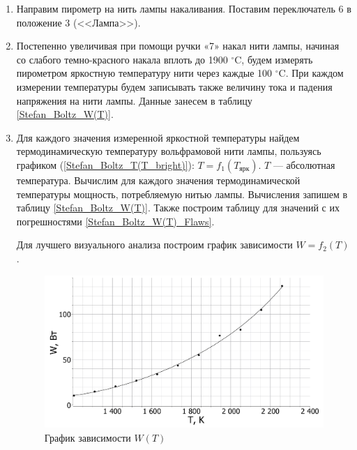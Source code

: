 	\begin{enumerate}
		\item Направим пирометр на нить лампы накаливания. Поставим переключатель 6 в положение 3 (<<Лампа>>).
		
		\item Постепенно увеличивая при помощи ручки «7» накал нити лампы, начиная со слабого темно-красного накала вплоть до 1900 $^\circ$C, будем измерять пирометром яркостную температуру нити через каждые 100 $^\circ$C. При каждом измерении температуры будем записывать также величину тока и падения напряжения на нити лампы.
Данные занесем в таблицу \ref{Stefan_Boltz_W(T)}.
		
		\item Для каждого значения измеренной яркостной температуры найдем термодинамическую температуру вольфрамовой нити лампы, пользуясь графиком (\ref{Stefan_Boltz_T(T_bright)}): $T = f_1(T_\text{ярк})$. $T$ — абсолютная температура. Вычислим для каждого значения термодинамической температуры мощность, потребляемую нитью лампы. Вычисления запишем в таблицу \ref{Stefan_Boltz_W(T)}. Также построим таблицу для значений с их погрешностями \ref{Stefan_Boltz_W(T)_Flaws}.
		
		Для лучшего визуального анализа построим график зависимости $W = f_2(T)$.
		\begin{figure}[h!]
			\centering
			\includegraphics[width=\linewidth]{Pictures/W(T).pdf}
			\caption{График зависимости $W(T)$}
		\end{figure}
		


\end{enumerate}
